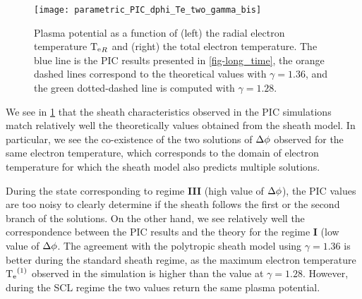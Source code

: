     \begin{figure}[hbt]
      \centering
      \texttt{[image: parametric\_PIC\_dphi\_Te\_two\_gamma\_bis]}
      \caption{Plasma potential as a function of (left) the radial electron temperature $\mathrm{T_e}_R$ and (right) the total electron temperature. The blue line is the \acs{PIC} results presented in \cref{fig-long_time}, the orange dashed lines correspond to the theoretical values with $\gamma=1.36$, and the green dotted-dashed line is computed with $\gamma=1.28$.}
      \label{fig-dphi_te_PIc2}
    \end{figure}
    
    We see in \cref{fig-dphi_te_PIc2} that the sheath characteristics observed in the \ac{PIC}  simulations match relatively well the theoretically values obtained from the sheath model.
    In particular, we see the co-existence of the two solutions of $\Delta \phi$ observed for the same electron temperature, which corresponds to the domain of electron temperature for which the sheath model also predicts multiple solutions.
    
    During the state corresponding to regime {\bf III} (high value of  $\Delta \phi$), the \ac{PIC} values are too noisy to clearly determine if the sheath follows the first or the second branch of the solutions.
    On the other hand, we see relatively well the correspondence between the \ac{PIC} results and the theory for the regime {\bf I} (low value of $\Delta \phi$.
    The agreement with the polytropic sheath model using $\gamma = 1.36$ is better during the standard sheath regime, as the maximum electron temperature $\mathrm{T_e}^{(1)}$ observed in the simulation is higher than the value at $\gamma=1.28$.
    However, during the \ac{SCL} regime the two values return the same plasma potential.
    
    
